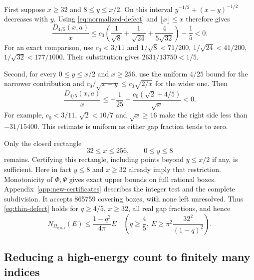 \documentclass[11pt,reqno]{amsart}
\numberwithin{equation}{section}
\newcommand{\Om}{\Omega}
\begin{document}
First suppose $x\ge32$ and $8\le y\le x/2$. On this
interval $y^{-1/2}+(x-y)^{-1/2}$ decreases with $y$.
Using \eqref{eq:normalized-defect} and $\lfloor x\rfloor\le x$
therefore gives
\[
 \frac{D_{4/5}(x,a)}x
 \le c_0\left(\frac1{\sqrt8}+\frac1{\sqrt{24}}
                         +\frac4{5\sqrt{32}}\right)-\frac15<0.
\]
For an exact comparison, use $c_0<3/11$ and
$1/\sqrt8<71/200$, $1/\sqrt{24}<41/200$,
$1/\sqrt{32}<177/1000$. Their substitution gives
$2631/13750<1/5$.

Second, for every $0\le y\le x/2$ and $x\ge256$, use
the uniform $4/25$ bound for the narrower contribution
and $c_0/\sqrt{x-y}\le c_0\sqrt{2/x}$ for the wider one.
Then
\begin{equation}\label{eq:thin-analytic-tail}
 \frac{D_{4/5}(x,a)}x
 \le-\frac1{25}
       +\frac{c_0(\sqrt2+4/5)}{\sqrt x}<0.
\end{equation}
For example, $c_0<3/11$, $\sqrt2<10/7$ and
$\sqrt x\ge16$ make the right side less than
$-31/15400$. This estimate is uniform as either gap
fraction tends to zero.

Only the closed rectangle
\begin{equation}\label{eq:thin-compact}
 32\le x\le256,\qquad0\le y\le8
\end{equation}
remains. Certifying this rectangle, including points beyond
$y\le x/2$ if any, is sufficient. Here in fact $y\le8$
and $x\ge32$ already imply that restriction. Monotonicity
of $\Phi,\Psi$ gives exact upper bounds on full rational
boxes. Appendix~\ref{app:new-certificates} describes the
integer test and the complete subdivision. It accepts
865759 covering boxes, with none left unresolved. Thus
\eqref{eq:thin-defect} holds for $q\ge4/5$, $x\ge32$,
all real gap fractions, and hence
\begin{equation}\label{eq:thin-uniform-tail}
 N_{\Om_{q,a,b}}(E)\le\frac{1-q^2}{4\pi}E
 \quad\left(q\ge\frac45,\ E\ge\pi^2\frac{32^2}{(1-q)^2}\right).
\end{equation}

\subsection*{Reducing a high-energy count to finitely many indices}
\end{document}
